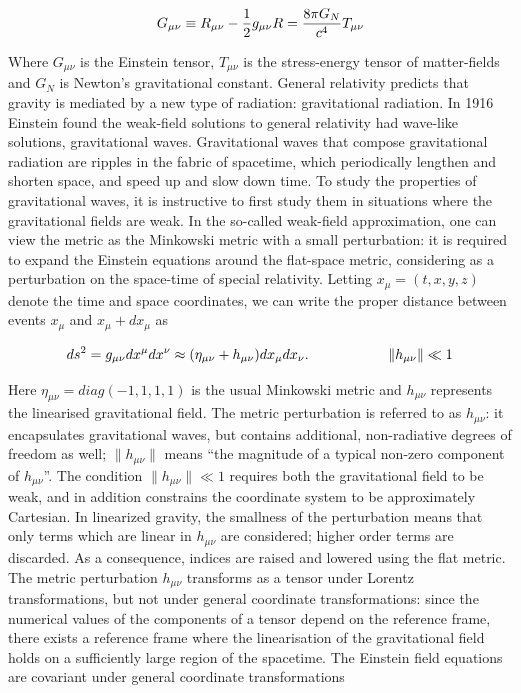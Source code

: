 \documentclass[binding=0.6cm, LaM]{sapthesis}
\begin{document}
		\begin{equation}
		G_{\mu\nu} \equiv R_{\mu\nu}  - {1 \over 2}g_{\mu\nu}R = {8\pi G_{N} \over {c^4}}T_{\mu\nu} 
		\end{equation}

	Where $G_{\mu\nu} $ is the Einstein tensor, $T_{\mu\nu} $ is the stress-energy 
	tensor of matter-fields and $ G_{N}$ is Newton’s gravitational constant.
	General relativity predicts that gravity is mediated by a new type of radiation: gravitational radiation.
	In 1916 Einstein found the weak-field solutions to general relativity had wave-like solutions, gravitational waves.
	Gravitational waves that compose gravitational radiation are ripples in the fabric of spacetime, 
	which periodically lengthen and shorten space, and speed up and slow down time.
 	To study the properties of gravitational waves, it is instructive to first study them 
	in situations where the gravitational fields are weak.
	In the so-called weak-field approximation, one can view the metric as the Minkowski metric 
	with a small perturbation: it is required to expand the Einstein equations around the flat-space metric,
	considering as a perturbation on the space-time of special relativity.
	Letting $ x_\mu = (t, x, y, z)$ denote the time and space coordinates, 
	we can write the proper distance between events $x_{\mu}$ and $x_{\mu} + dx_{\mu}$ as
		
		\[
		ds^2 = g_{\mu\nu}dx^{\mu}dx^{\nu} \approx (\eta_{\mu\nu} + h_{\mu\nu})dx_{\mu}dx_{\nu}. \hspace*{2cm}\|h_{\mu\nu}\|\ll 1
		\]

	Here $\eta_{\mu\nu} = diag(-1,1,1,1)$ is the usual Minkowski metric and $h_{\mu\nu}$ 
	represents the linearised gravitational field.
	The metric perturbation is referred to as  $h_{\mu\nu}$: it encapsulates gravitational waves, 
	but contains additional, non-radiative degrees of freedom as well; $\|h_{\mu\nu}\|$ means
	“the magnitude of a typical non-zero component of $h_{\mu\nu}$”. 
	The condition $\|h_{\mu\nu}\|\ll 1$ requires both the gravitational field to be weak, 
	and in addition constrains the coordinate system to be approximately Cartesian.  
	In linearized gravity, the smallness of the perturbation means that only terms which are linear in $h_{\mu\nu}$ are considered;
	higher order terms are discarded. As a consequence, indices are raised and lowered using the flat metric.
	The metric perturbation $h_{\mu\nu}$ transforms as a tensor under Lorentz transformations, 
	but not under general coordinate transformations: since the numerical values of the components
	of a tensor depend on the reference frame, there exists a reference frame where 
	the linearisation of the gravitational field holds on a sufficiently large region of the spacetime.
	The Einstein field equations are covariant under general coordinate transformations
\end{document}
